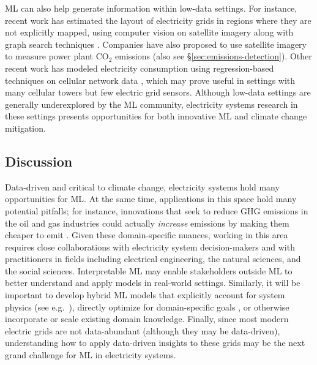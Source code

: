 \documentclass[11pt]{report}
\begin{document}
ML can also help generate information within low-data settings. For instance, recent work has estimated the layout of electricity grids in regions where they are not explicitly mapped, using computer vision on satellite imagery along with graph search techniques \cite{facebook2019predictive}. Companies have also proposed to use satellite imagery to measure power plant CO$_2$ emissions \cite{carbontracker} (also see \S\ref{sec:emissions-detection}). Other recent work has modeled electricity consumption using regression-based techniques on cellular network data \cite{bogomolov2016energy}, which may prove useful in settings with many cellular towers but few electric grid sensors. Although low-data settings are generally underexplored by the ML community, electricity systems research in these settings presents opportunities for both innovative ML and climate change mitigation. 

\subsection{Discussion}
Data-driven and critical to climate change, electricity systems hold many opportunities for ML. 
At the same time, applications in this space hold many potential pitfalls; for instance, innovations that seek to reduce GHG emissions in the oil and gas industries could actually \emph{increase} emissions by making them cheaper to emit \cite{victor2019how}. Given these domain-specific nuances, working in this area requires close collaborations with electricity system decision-makers and with practitioners in fields including electrical engineering, the natural sciences, and the social sciences. Interpretable ML may enable stakeholders outside ML to better understand and apply models in real-world settings. Similarly, it will be important to develop hybrid ML models that explicitly account for system physics (see e.g.~\cite{chen2018neural, schenck2018spnets, de2018end, ren2018learning}), directly optimize for domain-specific goals \cite{donti2017task, elmachtoub2017smart, wilder2018melding}, or otherwise incorporate or scale existing domain knowledge. Finally, since most modern electric grids are not data-abundant (although they may be data-driven), understanding how to apply data-driven insights to these grids may be the next grand challenge for ML in electricity systems.
\end{document}
